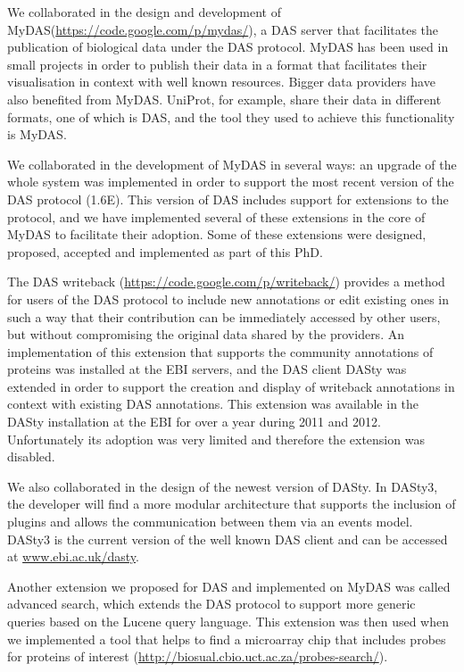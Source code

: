 We collaborated in the design and development of MyDAS(\url{https://code.google.com/p/mydas/}), a DAS server that facilitates the publication of biological data under the DAS protocol. MyDAS has been used in small projects in order to publish their data in a format that facilitates their visualisation in context with well known resources. Bigger data providers have also benefited from MyDAS. UniProt, for example, share their data in different formats, one of which is DAS, and the tool they used to achieve this functionality is MyDAS.

We collaborated in the development of MyDAS in several ways: an upgrade of the whole system was implemented in order to support the most recent version of the DAS protocol (1.6E). This version of DAS includes support for extensions to the protocol, and we have implemented several of these extensions in the core of MyDAS to facilitate their adoption. Some of these extensions were designed, proposed, accepted and implemented as part of this PhD. 

The DAS writeback (\url{https://code.google.com/p/writeback/}) provides a method for users of the DAS protocol to include new annotations or edit existing ones in such a way that their contribution can be immediately accessed by other users, but without compromising the original data shared by the providers. An implementation of this extension that supports the community annotations of proteins was installed at the EBI servers, and the DAS client DASty was extended in order to support the creation and display of writeback annotations in context with existing DAS annotations. This extension was available in the DASty installation at the EBI for over a year during 2011 and 2012. Unfortunately its adoption was very limited and therefore the extension was disabled.

We also collaborated in the design of the newest version of DASty. In DASty3, the developer will find a more modular architecture that supports the inclusion of plugins and allows the communication between them via an events model. DASty3 is the current version of the well known DAS client and can be accessed at \url{www.ebi.ac.uk/dasty}.

Another extension we proposed for DAS and implemented on MyDAS was called advanced search, which extends the DAS  protocol to support more generic queries based on the Lucene query language. This extension was then used when we implemented a tool that helps to find a microarray chip that includes probes for proteins of interest (\url{http://biosual.cbio.uct.ac.za/probes-search/}).

